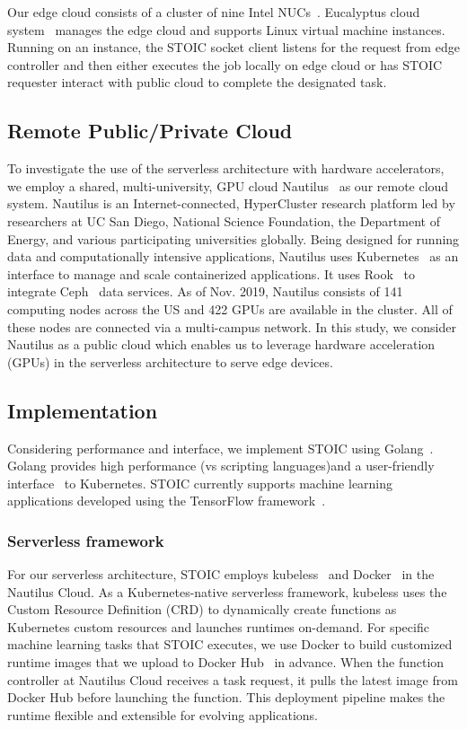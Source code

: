 Our edge cloud consists of a cluster of nine Intel NUCs~\cite{ref:nucs}.
Eucalyptus cloud system~\cite{ref:euca} manages the edge cloud and supports Linux virtual machine instances. Running on an instance, the STOIC socket client listens for the request from edge controller and then either executes the job locally on edge cloud or has STOIC requester interact with public cloud to complete the designated task.
 
 \subsection{Remote Public/Private Cloud}

To investigate the use of the serverless architecture with hardware 
accelerators, we employ a shared, multi-university, GPU cloud 
Nautilus~\cite{ref:nautilus} as our remote cloud system. Nautilus 
is an Internet-connected, HyperCluster research platform led by researchers at UC San Diego, National Science Foundation, the Department of Energy, and various participating universities globally.  Being designed for running data and computationally intensive applications, Nautilus uses Kubernetes~\cite{ref:k8s} as an interface to manage and scale containerized applications.  It uses 
Rook~\cite{ref:rook} to integrate Ceph~\cite{ref:ceph} data services. 
As of Nov. 2019, Nautilus consists of 141 computing nodes across the US 
and 422 GPUs are available in the cluster. All of these nodes are 
connected via a multi-campus network. In this study, we consider 
Nautilus as a public cloud which enables us to leverage 
hardware acceleration (GPUs) in the serverless 
architecture to serve edge devices. 
 
 \subsection{Implementation}
 
 Considering performance and interface, we
implement STOIC using Golang~\cite{golang}. Golang provides high 
performance (vs scripting languages)and a user-friendly 
interface~\cite{ref:client-go} to Kubernetes.  STOIC currently supports
machine learning applications developed using the TensorFlow 
framework~\cite{ref:tensorflow}.
 
 \BlankLine
 \subsubsection{Serverless framework}
 For our serverless architecture, STOIC employs 
kubeless~\cite{ref:kubeless} and Docker~\cite{ref:docker} in the
 Nautilus Cloud. As a Kubernetes-native serverless framework, 
kubeless uses the Custom Resource Definition (CRD)\cite{ref:crd} to dynamically create functions as Kubernetes custom resources and launches runtimes on-demand. For specific machine learning tasks that STOIC executes, we use Docker to build customized runtime images that we upload to Docker 
Hub~\cite{ref:dockerhub} in advance. When the function controller 
at Nautilus Cloud receives a task request, it pulls the latest image 
from Docker Hub before launching the function. This deployment pipeline 
makes the runtime flexible and extensible for evolving applications. 
 
